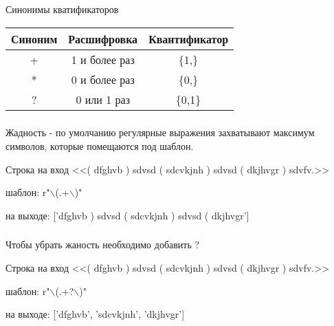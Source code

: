 \documentclass[t, 11pt]{beamer}
\begin{document}
	\begin{frame}
	\frametitle{\insertsection}
	\frametitle{\insertsubsection}  
	Синонимы кватификаторов 
	\begin{center}
		\begin{table}[]
			\begin{tabular}{c|c|c}
				\hline
				Синоним &Расшифровка &Квантификатор \\
				\hline
		+ & 1 и более раз &\{1,\}   \\
		* & 0 и более раз &\{0,\}   \\

		? &  0 или 1 раз& \{0,1\}  \\
  
			\end{tabular}
		\end{table}
	\end{center}
\end{frame}
	\begin{frame}
	\frametitle{\insertsection}
	\frametitle{\insertsubsection}  
	Жадность - по умолчанию регулярные выражения захватывают максимум символов, которые помещаются под шаблон.
	
	\vspace{0.5cm}
	
	Строка на вход  <<( dfghvb ) sdvsd ( sdcvkjnh ) sdvsd ( dkjhvgr ) sdvfv.>>
	
	\vspace{0.5cm}
	
	шаблон: r"$\backslash$(.+$\backslash$)"
	
	\vspace{0.5cm}
	
	на выходе: ['dfghvb ) sdvsd ( sdcvkjnh ) sdvsd ( dkjhvgr']
	
\end{frame}
\begin{frame}
	\frametitle{\insertsection}
	\frametitle{\insertsubsection}  
	Чтобы убрать жаность необходимо добавить ?
	
	\vspace{0.5cm}
	
	Строка на вход  <<( dfghvb ) sdvsd ( sdcvkjnh ) sdvsd ( dkjhvgr ) sdvfv.>>
	
	\vspace{0.5cm}
	
	шаблон: r"$\backslash$(.+?$\backslash$)"
	
	\vspace{0.5cm}
	
	на выходе: ['dfghvb', 'sdcvkjnh', 'dkjhvgr']
	
\end{frame}
\end{document}
